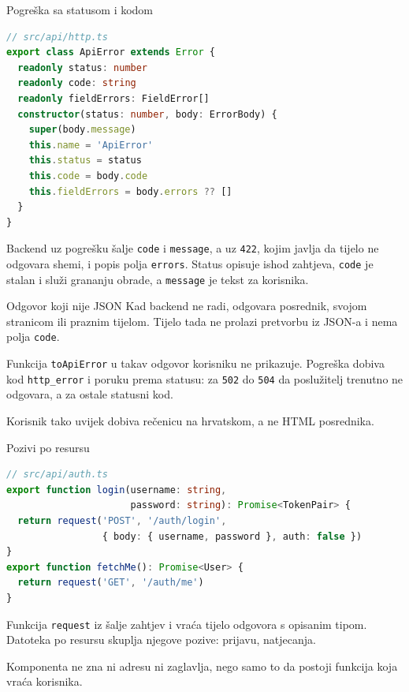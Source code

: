 \begin{frame}[fragile]{Pogreška sa statusom i kodom}
\begin{lstlisting}[language=typescript]
// src/api/http.ts
export class ApiError extends Error {
  readonly status: number
  readonly code: string
  readonly fieldErrors: FieldError[]
  constructor(status: number, body: ErrorBody) {
    super(body.message)
    this.name = 'ApiError'
    this.status = status
    this.code = body.code
    this.fieldErrors = body.errors ?? []
  }
}
\end{lstlisting}

\vspace{0.2em}
Backend uz pogrešku šalje \texttt{code} i \texttt{message}, a uz \texttt{422}, kojim javlja da tijelo ne odgovara shemi, i popis polja \texttt{errors}. Status opisuje ishod zahtjeva, \texttt{code} je stalan i služi grananju obrade, a \texttt{message} je tekst za korisnika.
\end{frame}

\begin{frame}{Odgovor koji nije JSON}
Kad backend ne radi, odgovara posrednik, svojom stranicom ili praznim tijelom. Tijelo tada ne prolazi pretvorbu iz JSON-a i nema polja \texttt{code}.

\vspace{0.9em}
Funkcija \texttt{toApiError} u  takav odgovor korisniku ne prikazuje. Pogreška dobiva kod \texttt{http\_error} i poruku prema statusu: za \texttt{502} do \texttt{504} da poslužitelj trenutno ne odgovara, a za ostale statusni kod.

\vspace{0.9em}
Korisnik tako uvijek dobiva rečenicu na hrvatskom, a ne HTML posrednika.
\end{frame}

\begin{frame}[fragile]{Pozivi po resursu}
\begin{lstlisting}[language=typescript]
// src/api/auth.ts
export function login(username: string,
                      password: string): Promise<TokenPair> {
  return request('POST', '/auth/login',
                 { body: { username, password }, auth: false })
}
export function fetchMe(): Promise<User> {
  return request('GET', '/auth/me')
}
\end{lstlisting}

\vspace{0.3em}
Funkcija \texttt{request} iz  šalje zahtjev i vraća tijelo odgovora s opisanim tipom. Datoteka po resursu skuplja njegove pozive:  prijavu,  natjecanja.

\vspace{0.3em}
Komponenta ne zna ni adresu ni zaglavlja, nego samo to da postoji funkcija koja vraća korisnika.
\end{frame}

